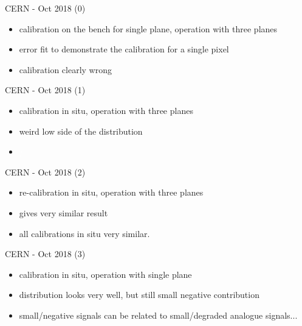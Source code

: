\begin{frame}{CERN - Oct 2018 (0)}

	
	\begin{itemize}\itemfill
		\item calibration on the bench for single plane, operation with three planes
		\item error fit to demonstrate the calibration for a single pixel
		\item calibration clearly wrong
	\end{itemize}
	
\end{frame}
\begin{frame}{CERN - Oct 2018 (1)}

	
	\begin{itemize}\itemfill
		\item calibration in situ, operation with three planes
		\item weird low side of the distribution
		\item[] \textcolor{white}{\ra/}
	\end{itemize}
	
\end{frame}
\begin{frame}{CERN - Oct 2018 (2)}

	
	\begin{itemize}\itemfill
		\item re-calibration in situ, operation with three planes
		\item gives very similar result
		\item all calibrations in situ very similar.
	\end{itemize}
	
\end{frame}
\begin{frame}{CERN - Oct 2018 (3)}

	
	\begin{itemize}\itemfill
		\item calibration in situ, operation with single plane
		\item distribution looks very well, but still small negative contribution
		\item \ra small/negative signals can be related to small/degraded analogue signals...
	\end{itemize}
	
\end{frame}
